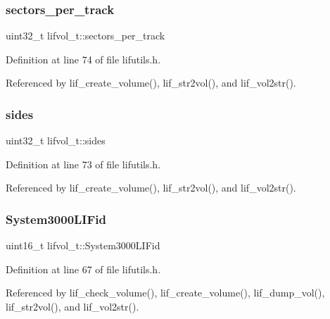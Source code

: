 \subsubsection{\texorpdfstring{sectors\+\_\+per\+\_\+track}{sectors\_per\_track}}
{\footnotesize\ttfamily uint32\+\_\+t lifvol\+\_\+t\+::sectors\+\_\+per\+\_\+track}



Definition at line 74 of file lifutils.\+h.



Referenced by lif\+\_\+create\+\_\+volume(), lif\+\_\+str2vol(), and lif\+\_\+vol2str().

\mbox{\label{structlifvol__t_a5b8ecfb441b010f69cb90b923cc50719}} 
\subsubsection{\texorpdfstring{sides}{sides}}
{\footnotesize\ttfamily uint32\+\_\+t lifvol\+\_\+t\+::sides}



Definition at line 73 of file lifutils.\+h.



Referenced by lif\+\_\+create\+\_\+volume(), lif\+\_\+str2vol(), and lif\+\_\+vol2str().

\mbox{\label{structlifvol__t_a98097f8c951448cbab6019b7b703e4d0}} 
\subsubsection{\texorpdfstring{System3000\+L\+I\+Fid}{System3000LIFid}}
{\footnotesize\ttfamily uint16\+\_\+t lifvol\+\_\+t\+::\+System3000\+L\+I\+Fid}



Definition at line 67 of file lifutils.\+h.



Referenced by lif\+\_\+check\+\_\+volume(), lif\+\_\+create\+\_\+volume(), lif\+\_\+dump\+\_\+vol(), lif\+\_\+str2vol(), and lif\+\_\+vol2str().

\mbox{\label{structlifvol__t_aae9e5135f98b80312eb785ac3747fc31}} 
